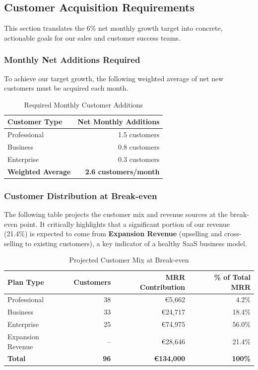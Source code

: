 \documentclass[11pt, a4paper, oneside]{article}
\begin{document}
\subsection{Customer Acquisition Requirements}
This section translates the 6\% net monthly growth target into concrete, actionable goals for our sales and customer success teams.

\subsubsection{Monthly Net Additions Required}
To achieve our target growth, the following weighted average of net new customers must be acquired each month.
\begin{table}[H]
    \centering
    \caption{Required Monthly Customer Additions}
    \begin{tabular}{lr}
    \toprule
    \textbf{Customer Type} & \textbf{Net Monthly Additions} \\
    \midrule
    Professional & 1.5 customers \\
    Business & 0.8 customers \\
    Enterprise & 0.3 customers \\
    \midrule
    \textbf{Weighted Average} & \textbf{2.6 customers/month} \\
    \bottomrule
    \end{tabular}
\end{table}

\subsubsection{Customer Distribution at Break-even}
The following table projects the customer mix and revenue sources at the break-even point. It critically highlights that a significant portion of our revenue (21.4\%) is expected to come from \textbf{Expansion Revenue} (upselling and cross-selling to existing customers), a key indicator of a healthy SaaS business model.
\begin{table}[H]
    \centering
    \caption{Projected Customer Mix at Break-even}
    \begin{tabular}{lrrr}
    \toprule
    \textbf{Plan Type} & \textbf{Customers} & \textbf{MRR Contribution} & \textbf{\% of Total MRR} \\
    \midrule
    Professional & 38 & \euro{5,662} & 4.2\% \\
    Business & 33 & \euro{24,717} & 18.4\% \\
    Enterprise & 25 & \euro{74,975} & 56.0\% \\
    Expansion Revenue & -- & \euro{28,646} & 21.4\% \\
    \midrule
    \textbf{Total} & \textbf{96} & \textbf{\euro{134,000}} & \textbf{100\%} \\
    \bottomrule
    \end{tabular}
\end{table}
\end{document}
